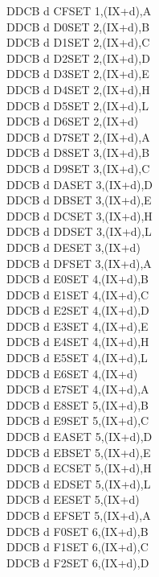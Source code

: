 \documentclass[12pt,twoside,openright,a4paper]{book}
\begin{document}
\begin{multicols}{3}
{\begin{tabbing}
	DDCB d CF\>SET 1,(IX+d),A\UNDOC\\
	DDCB d D0\>SET 2,(IX+d),B\UNDOC\\
	DDCB d D1\>SET 2,(IX+d),C\UNDOC\\
	DDCB d D2\>SET 2,(IX+d),D\UNDOC\\
	DDCB d D3\>SET 2,(IX+d),E\UNDOC\\
	DDCB d D4\>SET 2,(IX+d),H\UNDOC\\
	DDCB d D5\>SET 2,(IX+d),L\UNDOC\\
	DDCB d D6\>SET 2,(IX+d)\\
	DDCB d D7\>SET 2,(IX+d),A\UNDOC\\
	DDCB d D8\>SET 3,(IX+d),B\UNDOC\\
	DDCB d D9\>SET 3,(IX+d),C\UNDOC\\
	DDCB d DA\>SET 3,(IX+d),D\UNDOC\\
	DDCB d DB\>SET 3,(IX+d),E\UNDOC\\
	DDCB d DC\>SET 3,(IX+d),H\UNDOC\\
	DDCB d DD\>SET 3,(IX+d),L\UNDOC\\
	DDCB d DE\>SET 3,(IX+d)\\
	DDCB d DF\>SET 3,(IX+d),A\UNDOC\\
	DDCB d E0\>SET 4,(IX+d),B\UNDOC\\
	DDCB d E1\>SET 4,(IX+d),C\UNDOC\\
	DDCB d E2\>SET 4,(IX+d),D\UNDOC\\
	DDCB d E3\>SET 4,(IX+d),E\UNDOC\\
	DDCB d E4\>SET 4,(IX+d),H\UNDOC\\
	DDCB d E5\>SET 4,(IX+d),L\UNDOC\\
	DDCB d E6\>SET 4,(IX+d)\\
	DDCB d E7\>SET 4,(IX+d),A\UNDOC\\
	DDCB d E8\>SET 5,(IX+d),B\UNDOC\\
	DDCB d E9\>SET 5,(IX+d),C\UNDOC\\
	DDCB d EA\>SET 5,(IX+d),D\UNDOC\\
	DDCB d EB\>SET 5,(IX+d),E\UNDOC\\
	DDCB d EC\>SET 5,(IX+d),H\UNDOC\\
	DDCB d ED\>SET 5,(IX+d),L\UNDOC\\
	DDCB d EE\>SET 5,(IX+d)\\
	DDCB d EF\>SET 5,(IX+d),A\UNDOC\\
	DDCB d F0\>SET 6,(IX+d),B\UNDOC\\
	DDCB d F1\>SET 6,(IX+d),C\UNDOC\\
	DDCB d F2\>SET 6,(IX+d),D\UNDOC\\

\end{tabbing}}
\end{multicols}
\end{document}
